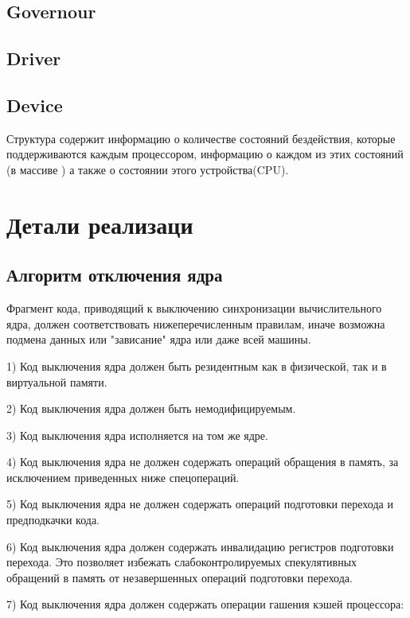 \documentclass{article}
\begin{document}
\subsection{Governour}


\subsection{Driver}


\subsection{Device}
Структура содержит информацию о количестве состояний бездействия, которые поддерживаются каждым процессором, информацию о каждом из этих состояний (в массиве ) а также о состоянии этого устройства(CPU).





\newpage
\section{Детали реализаци}

\subsection{Алгоритм отключения ядра}

Фрагмент кода, приводящий к выключению синхронизации вычислительного ядра,
должен соответствовать нижеперечисленным правилам, иначе возможна подмена данных
или "зависание" ядра или даже всей машины.

1) Код выключения ядра должен быть резидентным как в физической, так и в
виртуальной памяти.

2) Код выключения ядра должен быть немодифицируемым.

3) Код выключения ядра исполняется на том же ядре.

4) Код выключения ядра не должен содержать операций обращения в память, за
исключением приведенных ниже спецопераций.

5) Код выключения ядра не должен содержать операций подготовки перехода и
предподкачки кода.

6) Код выключения ядра должен содержать инвалидацию регистров подготовки
перехода. Это позволяет избежать слабоконтролируемых спекулятивных обращений в
память от незавершенных операций подготовки перехода.

7) Код выключения ядра должен содержать операции гашения кэшей процессора:
\end{document}
